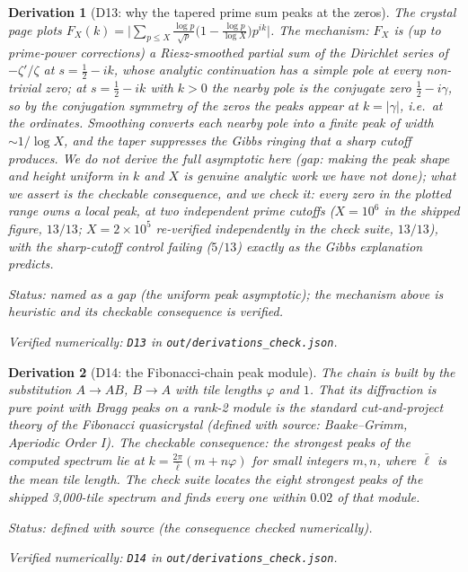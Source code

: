 \documentclass[11pt]{article}
\newtheorem{deriv}{Derivation}
\theoremstyle{remark}
\newcommand{\bucket}[1]{\par\smallskip\noindent\textit{Status: #1.}}
\newcommand{\chk}[1]{\par\noindent\textit{Verified numerically:
\texttt{#1} in \texttt{out/derivations\_check.json}.}}
\begin{document}
\begin{deriv}[D13: why the tapered prime sum peaks at the
zeros]\label{d13}
The crystal page plots
$F_X(k) = \bigl|\sum_{p \le X} \tfrac{\log p}{\sqrt p}
\bigl(1 - \tfrac{\log p}{\log X}\bigr) p^{ik}\bigr|$. The mechanism:
$F_X$ is (up to prime-power corrections) a Riesz-smoothed partial sum
of the Dirichlet series of $-\zeta'/\zeta$ at $s = \tfrac12 - ik$,
whose analytic continuation has a simple pole at every non-trivial
zero; at $s = \tfrac12 - ik$ with $k > 0$ the nearby pole is the
conjugate zero $\tfrac12 - i\gamma$, so by the conjugation symmetry
of the zeros the peaks appear at $k = |\gamma|$, i.e.\ at the
ordinates. Smoothing converts each nearby pole into a finite peak of
width $\sim 1/\log X$, and the
taper suppresses the Gibbs ringing that a sharp cutoff produces. We
do not derive the full asymptotic here (gap: making the peak shape
and height uniform in $k$ and $X$ is genuine analytic work we have
not done); what we assert is the checkable consequence, and we check
it: every zero in the plotted range owns a local peak, at two
independent prime cutoffs ($X = 10^6$ in the shipped figure, $13/13$;
$X = 2\times10^5$ re-verified independently in the check suite,
$13/13$), with the sharp-cutoff control failing ($5/13$) exactly as
the Gibbs explanation predicts.
\bucket{named as a gap (the uniform peak asymptotic); the mechanism
above is heuristic and its checkable consequence is verified}\chk{D13}
\end{deriv}

\begin{deriv}[D14: the Fibonacci-chain peak module]\label{d14}
The chain is built by the substitution $A \to AB$, $B \to A$ with tile
lengths $\varphi$ and $1$. That its diffraction is pure point with
Bragg peaks on a rank-2 module is the standard cut-and-project theory
of the Fibonacci quasicrystal (defined with source: Baake--Grimm,
\emph{Aperiodic Order} I). The checkable consequence: the strongest
peaks of the computed spectrum lie at
$k = \tfrac{2\pi}{\bar\ell}(m + n\varphi)$ for small integers $m, n$,
where $\bar\ell$ is the mean tile length. The check suite locates the
eight strongest peaks of the shipped 3{,}000-tile spectrum and finds
every one within $0.02$ of that module.
\bucket{defined with source (the consequence checked numerically)}
\chk{D14}
\end{deriv}
\end{document}
